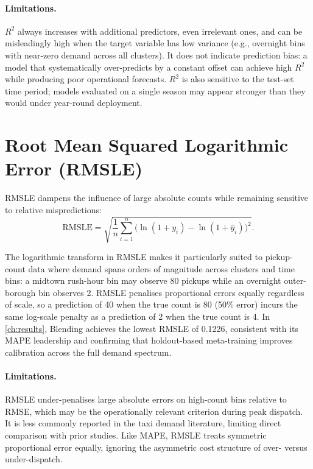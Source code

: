 \paragraph{Limitations.} $R^2$ always increases with additional predictors, even irrelevant ones, and can be misleadingly high when the target variable has low variance (e.g., overnight bins with near-zero demand across all clusters). It does not indicate prediction bias: a model that systematically over-predicts by a constant offset can achieve high $R^2$ while producing poor operational forecasts. $R^2$ is also sensitive to the test-set time period; models evaluated on a single season may appear stronger than they would under year-round deployment.

\section{Root Mean Squared Logarithmic Error (RMSLE)}

RMSLE dampens the influence of large absolute counts while remaining sensitive to relative mispredictions:
\begin{equation}
 \text{RMSLE} = \sqrt{\frac{1}{n}\sum_{i=1}^n \bigl(\ln(1+y_i)-\ln(1+\hat{y}_i)\bigr)^2}.
 \label{eq:rmsle}
\end{equation}

The logarithmic transform in RMSLE makes it particularly suited to pickup-count data where demand spans orders of magnitude across clusters and time bins: a midtown rush-hour bin may observe 80 pickups while an overnight outer-borough bin observes 2. RMSLE penalises proportional errors equally regardless of scale, so a prediction of 40 when the true count is 80 (50\% error) incurs the same log-scale penalty as a prediction of 2 when the true count is 4. In \autoref{ch:results}, Blending achieves the lowest RMSLE of 0.1226, consistent with its MAPE leadership and confirming that holdout-based meta-training improves calibration across the full demand spectrum.

\paragraph{Limitations.} RMSLE under-penalises large absolute errors on high-count bins relative to RMSE, which may be the operationally relevant criterion during peak dispatch. It is less commonly reported in the taxi demand literature, limiting direct comparison with prior studies. Like MAPE, RMSLE treats symmetric proportional error equally, ignoring the asymmetric cost structure of over- versus under-dispatch.

